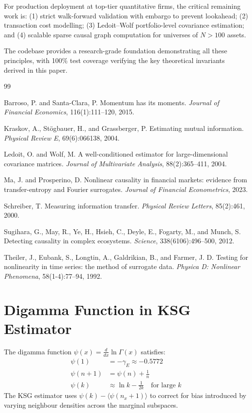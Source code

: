 \documentclass[11pt]{article}
\begin{document}
For production deployment at top-tier quantitative firms, the critical remaining work is: (1) strict walk-forward validation with embargo to prevent lookahead; (2) transaction cost modelling; (3) Ledoit--Wolf portfolio-level covariance estimation; and (4) scalable sparse causal graph computation for universes of $N > 100$ assets.

The codebase provides a research-grade foundation demonstrating all these principles, with 100\% test coverage verifying the key theoretical invariants derived in this paper.

\begin{thebibliography}{99}

 Barroso, P. and Santa-Clara, P. Momentum has its moments. \textit{Journal of Financial Economics}, 116(1):111--120, 2015.

 Kraskov, A., St\"ogbauer, H., and Grassberger, P. Estimating mutual information. \textit{Physical Review E}, 69(6):066138, 2004.

 Ledoit, O. and Wolf, M. A well-conditioned estimator for large-dimensional covariance matrices. \textit{Journal of Multivariate Analysis}, 88(2):365--411, 2004.

 Ma, J. and Prosperino, D. Nonlinear causality in financial markets: evidence from transfer-entropy and Fourier surrogates. \textit{Journal of Financial Econometrics}, 2023.

 Schreiber, T. Measuring information transfer. \textit{Physical Review Letters}, 85(2):461, 2000.

 Sugihara, G., May, R., Ye, H., Hsieh, C., Deyle, E., Fogarty, M., and Munch, S. Detecting causality in complex ecosystems. \textit{Science}, 338(6106):496--500, 2012.

 Theiler, J., Eubank, S., Longtin, A., Galdrikian, B., and Farmer, J. D. Testing for nonlinearity in time series: the method of surrogate data. \textit{Physica D: Nonlinear Phenomena}, 58(1-4):77--94, 1992.

\end{thebibliography}

\appendix

\section{Digamma Function in KSG Estimator}

The digamma function $\psi(x) = \frac{d}{dx}\ln\Gamma(x)$ satisfies:
\begin{align}
\psi(1) &= -\gamma_E \approx -0.5772 \label{eq:digamma1} \\
\psi(n+1) &= \psi(n) + \frac{1}{n} \label{eq:digamma2} \\
\psi(k) &\approx \ln k - \frac{1}{2k} \quad \text{for large } k \label{eq:digamma3}
\end{align}
The KSG estimator uses $\psi(k) - \langle \psi(n_x+1) \rangle$ to correct for bias introduced by varying neighbour densities across the marginal subspaces.
\end{document}

